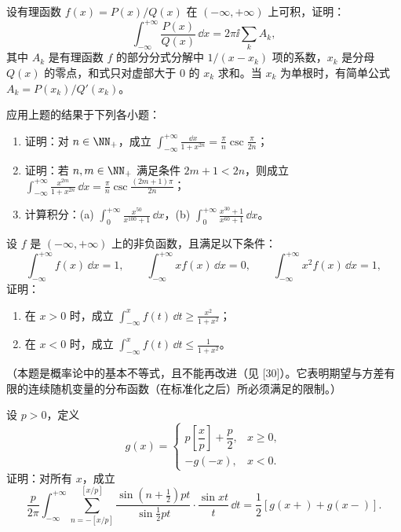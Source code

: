 \begin{xreferenceproblem}[7]
设有理函数 $f(x)=P(x)/Q(x)$ 在 $(-\infty,+\infty)$ 上可积，证明：
  \[
    \int_{-\infty}^{+\infty}\frac{P(x)}{Q(x)}\,\dd x=2\pi\ii\sum_k A_k,
  \]
  其中 $A_k$ 是有理函数 $f$ 的部分分式分解中 $1/(x-x_k)$ 项的系数，$x_k$ 是分母 $Q(x)$ 的零点，和式只对虚部大于 0 的 $x_k$ 求和。当 $x_k$ 为单根时，有简单公式 $A_k=P(x_k)/Q'(x_k)$。
\end{xreferenceproblem}

\begin{xreferenceproblem}[8]
应用上题的结果于下列各小题：
  \begin{enumerate}[label=(\arabic*)]
    \item 证明：对 $n\in\NN_+$，成立 $\displaystyle\int_{-\infty}^{+\infty}\frac{\dd x}{1+x^{2n}}=\frac\pi n\operatorname{csc}\frac\pi{2n}$；
    \item 证明：若 $n,m\in\NN_+$ 满足条件 $2m+1<2n$，则成立 $\displaystyle\int_{-\infty}^{+\infty}\frac{x^{2m}}{1+x^{2n}}\,\dd x=\frac\pi n\operatorname{csc}\frac{(2m+1)\pi}{2n}$；
    \item 计算积分：\textup{(a)} $\displaystyle\int_0^{+\infty}\frac{x^{50}}{x^{100}+1}\,\dd x$，\textup{(b)} $\displaystyle\int_0^{+\infty}\frac{x^{30}+1}{x^{60}+1}\,\dd x$。
  \end{enumerate}
\end{xreferenceproblem}

\begin{xreferenceproblem}[9]
设 $f$ 是 $(-\infty,+\infty)$ 上的非负函数，且满足以下条件：
  \[
    \int_{-\infty}^{+\infty}f(x)\,\dd x=1,\qquad
    \int_{-\infty}^{+\infty}xf(x)\,\dd x=0,\qquad
    \int_{-\infty}^{+\infty}x^2f(x)\,\dd x=1,
  \]
  证明：
  \begin{enumerate}[label=(\arabic*)]
    \item 在 $x>0$ 时，成立 $\displaystyle\int_{-\infty}^x f(t)\,\dd t\geq\frac{x^2}{1+x^2}$；
    \item 在 $x<0$ 时，成立 $\displaystyle\int_{-\infty}^x f(t)\,\dd t\leq\frac1{1+x^2}$。
  \end{enumerate}
  （本题是概率论中的基本不等式，且不能再改进（见 [30]）。它表明期望与方差有限的连续随机变量的分布函数（在标准化之后）所必须满足的限制。）
\end{xreferenceproblem}

\begin{xreferenceproblem}[10]
设 $p>0$，定义
  \[
    g(x)=
    \begin{cases}
      p\left[\dfrac xp\right]+\dfrac p2, & x\geq0,\\
      -g(-x), & x<0.
    \end{cases}
  \]
  证明：对所有 $x$，成立
  \[
    \frac{p}{2\pi}\int_{-\infty}^{+\infty}
    \sum_{n=-[x/p]}^{[x/p]}
    \frac{\sin\left(n+\frac12\right)pt}{\sin\frac12pt}\cdot\frac{\sin xt}{t}\,\dd t
    =\frac12[g(x+)+g(x-)].
  \]
\end{xreferenceproblem}
